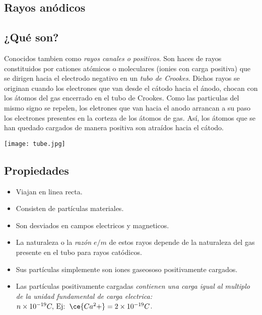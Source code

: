 \documentclass[letterpaper, 12pt]{article}
\begin{document}
        \begin{justify}
    \thispagestyle{empty}
    \section*{Rayos anódicos}
    \subsection*{¿Qué son?}
    Conocidos tambien como \emph{rayos canales o positivos}. Son haces de rayos constituidos por cationes atómicos o moleculares (ionies con carga positiva)
    que se dirigen hacia el electrodo negativo en un \emph{tubo de Crookes}. Dichos rayos se originan cuando los electrones que van desde el cátodo hacia el ánodo, chocan con los átomos del gas encerrado en el tubo de Crookes.
    Como las particulas del mismo signo se repelen, los eletrones que van hacia el anodo arrancan a su paso los electrones presentes en la corteza de los átomos de gas. Así, los átomos que se han quedado cargados de manera positiva
    son atraídos hacia el cátodo.
    \begin{center}
        \texttt{[image: tube.jpg]}
    \end{center}
    \subsection*{Propiedades}
    \begin{itemize}
        \item Viajan en linea recta.
        \item Consisten de partículas materiales.
        \item Son desviados en campos electricos y magneticos.
        \item La naturaleza o la \emph{razón \(e/m\)} de estos rayos depende de la naturaleza del gas presente en el tubo para rayos catódicos.
        \item Sus partículas simplemente son iones gaseososo positivamente cargados.
        \item Las partículas positivamente cargadas \emph{contienen una carga igual al multiplo de la unidad fundamental de carga electrica: }\(n\times 10^{-19}C,\,\text{Ej: }\,\ce{Ca^2+}=2\times 10^{-19}C\).
    \end{itemize}
        \end{justify}

        \newpage
        \thispagestyle{empty}
        \printbibliography
\end{document}
